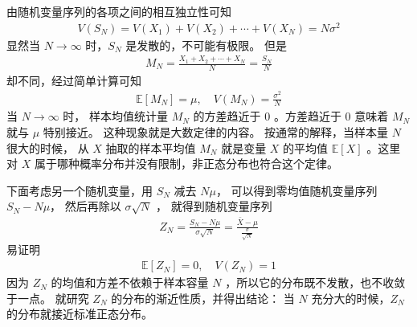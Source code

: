 \documentclass[letterpaper,10pt,english]{sphinxmanual}
\begin{document}
由随机变量序列的各项之间的相互独立性可知
\begin{equation}\label{equation:推断与检验/content:推断与检验/content:21}
\begin{split}V(S_N) = V(X_1) + V(X_2) + \cdots +V(X_N) = N \sigma^2\end{split}
\end{equation}
显然当 \(N \rightarrow \infty\) 时，\(S_N\) 是发散的，不可能有极限。
但是 
\begin{equation}\label{equation:推断与检验/content:推断与检验/content:22}
\begin{split}M_N = \frac{X_1+X_2+\cdots+X_N}{N} = \frac{S_N}{N}\end{split}
\end{equation}
却不同，经过简单计算可知
\begin{equation}\label{equation:推断与检验/content:推断与检验/content:23}
\begin{split}\mathbb{E}[M_N] = \mu, \quad V(M_N) = \frac{\sigma^2}{N}\end{split}
\end{equation}
当 \(N \rightarrow \infty\) 时，
样本均值统计量 \(M_N\) 的方差趋近于 \(0\)
。方差趋近于 \(0\) 意味着 \(M_N\) 就与 \(\mu\) 特别接近。
这种现象就是大数定律的内容。
按通常的解释，当样本量 \(N\) 很大的时候，
从 \(X\) 抽取的样本平均值 \(M_N\) 就是变量 \(X\) 的平均值 \(\mathbb{E}[X]\)
。这里对 \(X\) 属于哪种概率分布并没有限制，非正态分布也符合这个定律。

下面考虑另一个随机变量，用 \(S_N\) 减去 \(N\mu\)，
可以得到零均值随机变量序列 \(S_N - N\mu\)，
然后再除以 \(\sigma \sqrt{N}\) ，
就得到随机变量序列
\begin{equation}\label{equation:推断与检验/content:推断与检验/content:24}
\begin{split}Z_N = \frac{S_N - N \mu}{\sigma \sqrt{N}} = \frac{\bar{X} - \mu}{\frac{\sigma}{ \sqrt{N}} }\end{split}
\end{equation}
易证明
\begin{equation}\label{equation:推断与检验/content:推断与检验/content:25}
\begin{split}\mathbb{E}[Z_N] = 0, \quad V(Z_N) = 1\end{split}
\end{equation}
因为 \(Z_N\) 的均值和方差不依赖于样本容量 \(N\)
，所以它的分布既不发散，也不收敛于一点。
 就研究 \(Z_N\) 的分布的渐近性质，并得出结论：
当 \(N\) 充分大的时候，\(Z_N\) 的分布就接近标准正态分布。
\end{document}
